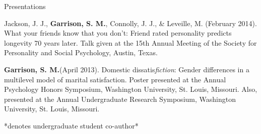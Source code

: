 \documentclass {resume}
\newcommand{\meb}{{\bf Garrison, S. M.}\xspace}
\newlength{\wideitemsep}
\let\olditem\item
\renewcommand{\item}{\setlength{\itemsep}{\wideitemsep}\olditem}
\begin{document}
\begin{rSection}{\textrm{Presentations}}
\begin{etaremune}
\item Jackson, J. J., \textbf{Garrison, S. M.}, Connolly, J. J., \& Leveille, M. (February 2014). What your friends know that you don't: Friend rated personality predicts longevity 70 years later. Talk given at the 15th Annual Meeting of the Society for Personality and  Social Psychology, Austin, Texas.
\item\meb (April 2013). Domestic dissatis{\em fiction}: Gender differences in a multilevel model of marital satisfaction. Poster presented at the Annual Psychology Honors Symposium, Washington  University, St. Louis, Missouri. Also, presented at the Annual Undergraduate Research Symposium, Washington University, St. Louis, Missouri.
\end{etaremune}\vspace{-3mm}\begin{center}\footnotesize{*denotes undergraduate student co-author*}\end{center} \vspace{-3mm}%
\end{rSection}
\pagestyle{myheadings}
\end{document}
